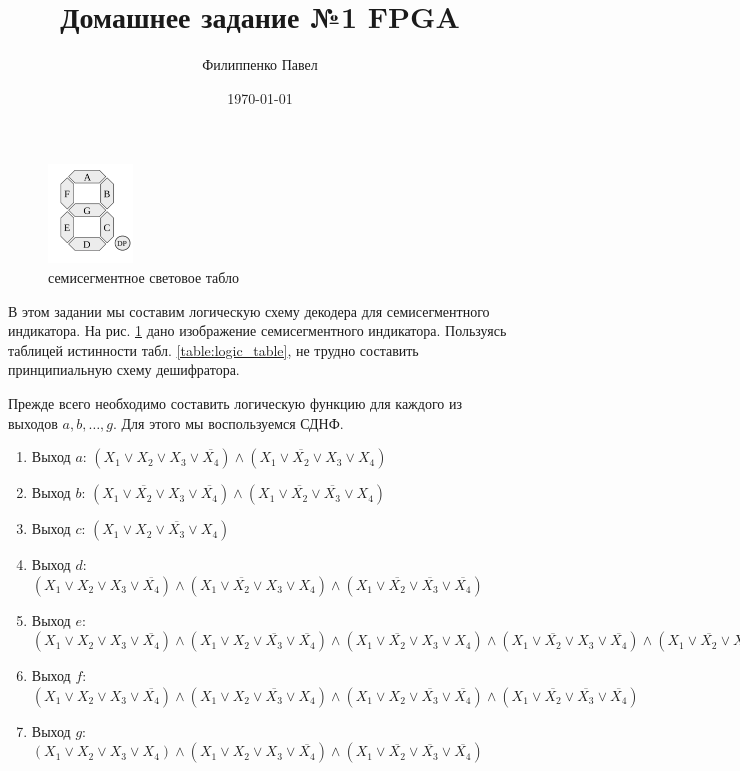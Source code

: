 \documentclass[a4paper, 12pt]{article}
\author{Филиппенко Павел}
\title{Домашнее задание №1 FPGA}
\date{\today}
\newcommand{\AND}{\wedge}
\newcommand{\Or}{\vee}
\newcommand{\Not}{\overline}
\begin{document}
\maketitle

\begin{figure}
    \centering
    \includegraphics[width = 0.2\textwidth]{images/seven_seg_indecator.png}
    \caption{семисегментное световое табло}
    \label{fig:seven_seg_indicator}
\end{figure}

В этом задании мы составим логическую схему декодера для семисегментного индикатора. На рис. \ref{fig:seven_seg_indicator} дано изображение семисегментного
индикатора. Пользуясь таблицей истинности табл. \ref{table:logic_table}, не трудно составить
принципиальную схему дешифратора.



Прежде всего необходимо составить логическую функцию для каждого из выходов $a, b, \dots, g$. Для этого мы воспользуемся СДНФ.

\begin{enumerate}
    \item Выход $a$: $(X_1 \Or X_2 \Or X_3 \Or \Not{X_4}) \AND (X_1 \Or \Not{X_2} \Or X_3 \Or X_4)$
    \item Выход $b$: $(X_1 \Or \Not{X_2} \Or X_3 \Or \Not{X_4}) \AND (X_1 \Or \Not{X_2} \Or \Not{X_3} \Or X_4)$
    \item Выход $c$: $(X_1 \Or X_2 \Or \Not{X_3} \Or X_4)$
    \item Выход $d$: $(X_1 \Or X_2 \Or X_3 \Or \Not{X_4}) \AND (X_1 \Or \Not{X_2} \Or X_3 \Or X_4) \AND (X_1 \Or \Not{X_2} \Or \Not{X_3} \Or \Not{X_4})$
    \item Выход $e$: $(X_1 \Or X_2 \Or X_3 \Or \Not{X_4}) \AND (X_1 \Or X_2 \Or \Not{X_3} \Or \Not{X_4}) \AND (X_1 \Or \Not{X_2} \Or X_3 \Or X_4) \AND (X_1 \Or \Not{X_2} \Or X_3 \Or \Not{X_4}) \AND (X_1 \Or \Not{X_2} \Or \Not{X_3} \Or \Not{X_4}) \AND (\Not{X_1} \Or X_2 \Or X_3 \Or \Not{X_4})$
    \item Выход $f$: $(X_1 \Or X_2 \Or X_3 \Or \Not{X_4}) \AND (X_1 \Or X_2 \Or \Not{X_3} \Or X_4) \AND (X_1 \Or X_2 \Or \Not{X_3} \Or \Not{X_4}) \AND (X_1 \Or \Not{X_2} \Or \Not{X_3} \Or \Not{X_4})$
    \item Выход $g$: $(X_1 \Or X_2 \Or X_3 \Or X_4) \AND (X_1 \Or X_2 \Or X_3 \Or \Not{X_4}) \AND (X_1 \Or \Not{X_2} \Or \Not{X_3} \Or \Not{X_4})$
\end{enumerate}
\end{document}
